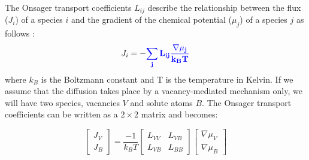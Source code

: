\documentclass[preprint,12pt]{elsarticle}
\providecommand{\DIFadd}[1]{{\bf #1}} %
\providecommand{\DIFdel}[1]{} %
\providecommand{\DIFaddbegin}{\protect\color{blue}} %
\providecommand{\DIFaddend}{\protect\color{black}} %
\providecommand{\DIFdelbegin}{\protect\color{red}} %
\providecommand{\DIFdelend}{\protect\color{black}} %
\newcommand{\DIFscaledelfig}{0.5}
\newlength{\DIFdelgraphicswidth} %
\newlength{\DIFdelgraphicsheight} %
\newcommand{\DIFaddincludegraphics}[2][]{{\color{blue}\fbox{\DIFOincludegraphics[#1]{#2}}}} %
\newcommand{\DIFdelincludegraphics}[2][]{%
\sbox{\DIFdelgraphicsbox}{\DIFOincludegraphics[#1]{#2}}%
\settoboxwidth{\DIFdelgraphicswidth}{\DIFdelgraphicsbox} %
\settoboxtotalheight{\DIFdelgraphicsheight}{\DIFdelgraphicsbox} %
\scalebox{\DIFscaledelfig}{%
\parbox[b]{\DIFdelgraphicswidth}{\usebox{\DIFdelgraphicsbox}\\[-\baselineskip] \rule{\DIFdelgraphicswidth}{0em}}\llap{\resizebox{\DIFdelgraphicswidth}{\DIFdelgraphicsheight}{%
\setlength{\unitlength}{\DIFdelgraphicswidth}%
\begin{picture}(1,1)%
\thicklines\linethickness{2pt} %
{\color[rgb]{1,0,0}\put(0,0){\framebox(1,1){}}}%
{\color[rgb]{1,0,0}\put(0,0){\line( 1,1){1}}}%
{\color[rgb]{1,0,0}\put(0,1){\line(1,-1){1}}}%
\end{picture}%
}\hspace*{3pt}}} %
} %
\DeclareRobustCommand{\DIFaddbegin}{\DIFOaddbegin \let\includegraphics\DIFaddincludegraphics} %
\DeclareRobustCommand{\DIFaddend}{\DIFOaddend \let\includegraphics\DIFOincludegraphics} %
\DeclareRobustCommand{\DIFdelbegin}{\DIFOdelbegin \let\includegraphics\DIFdelincludegraphics} %
\DeclareRobustCommand{\DIFdelend}{\DIFOaddend \let\includegraphics\DIFOincludegraphics} %
\begin{document}
The Onsager transport coefficients $L_{ij}$ describe the relationship between the flux ($J_i$) of a species $i$ and the gradient of the chemical potential ($\mu_j$) of a species $j$ as follows \cite{allnatt_atomic_2003} :
\begin{equation}
\label{eq_onsager}
    J_i = -\DIFdelbegin \DIFdel{\sum{L_{ij} \frac{\nabla\mu_j}{k_B T}}
}\DIFdelend \DIFaddbegin \DIFadd{\sum_j{L_{ij} \frac{\nabla\mu_j}{k_B T}}
}\DIFaddend \end{equation}
where $k_B$ is the Boltzmann constant and T is the temperature in Kelvin. If we assume that the diffusion takes place by a vacancy-mediated mechanism only, we will have two species, vacancies $V$ and solute atoms $B$. The Onsager transport coefficients can be written as a $2\times2$ matrix and  becomes:

\begin{equation}
\label{matrix_form_onsager}
    \begin{bmatrix}
        J_V \\
        J_B 
    \end{bmatrix}=\frac{-1}{k_B T}
    \begin{bmatrix}
    L_{VV} & L_{VB} \\
    L_{VB} & L_{BB}
    \end{bmatrix}
        \begin{bmatrix}
        \nabla\mu_V \\
        \nabla\mu_B
    \end{bmatrix}
\end{equation}
\end{document}
